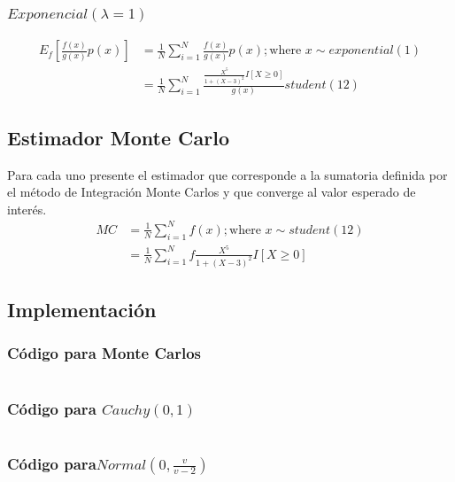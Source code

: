 \documentclass{article}
\begin{document}
\subsubsection{$Exponencial(\lambda=1)$}
\[
	\begin{split}
		E_f\left[\frac{f(x)}{g(x)}p(x)\right] & = \frac{1}{N}\sum_{i=1}^{N}\frac{f(x)}{g(x)}p(x) ; \text{where } x \sim exponential(1) \\
		                                      & = \frac{1}{N}\sum_{i=1}^{N}\frac{\frac{X^5}{1+(X - 3)^2}I[X \ge 0] }{g(x)}student(12)
	\end{split}
\]


\subsection{Estimador Monte Carlo}
Para cada uno presente el estimador que corresponde a la sumatoria definida por el método de Integración
Monte Carlos y que converge al valor esperado de interés.
\[
	\begin{split}
		MC & = \frac{1}{N}\sum_{i=1}^{N}f(x) ; \text{where } x \sim student(12) \\
		   & = \frac{1}{N}\sum_{i=1}^{N}f\frac{X^5}{1+(X - 3)^2}I[X \ge 0]
	\end{split}
\]


\subsection{Implementación}

\subsubsection{Código para Monte Carlos}
\begin{pythonbox}
	\inputminted{python}{code/mc.py}
\end{pythonbox}

\subsubsection{Código para $Cauchy(0,1)$}
\begin{pythonbox}
	\inputminted{python}{code/cauchy.py}
\end{pythonbox}

\subsubsection{Código para$Normal(0, \frac{v}{v-2})$}
\begin{pythonbox}
	\inputminted{python}{code/normal.py}
\end{pythonbox}
\end{document}
